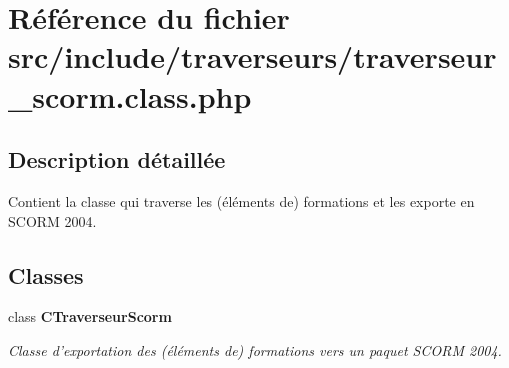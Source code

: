 \section{Référence du fichier src/include/traverseurs/traverseur\_\-scorm.class.php}
\label{traverseur__scorm_8class_8php}


\subsection{Description détaillée}
Contient la classe qui traverse les (éléments de) formations et les exporte en SCORM 2004. 



\subsection*{Classes}
\begin{CompactItemize}
\item 
class {\bf CTraverseurScorm}
\begin{CompactList}\small\item\em Classe d'exportation des (éléments de) formations vers un paquet SCORM 2004. \item\end{CompactList}\end{CompactItemize}
